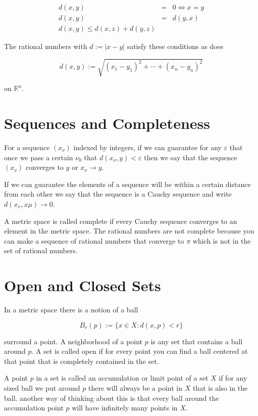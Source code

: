 \documentclass[oneside]{book}
\begin{document}
\begin{eqnarray}
d(x,y) &=& 0 \iff x =y\nonumber\\
d(x,y) &=& d(y,x) \\
d(x,y) \le d(x,z) + d(y,z)
\end{eqnarray}

The rational numbers with $d := | x-y |$ satisfy these conditions as does

\begin{equation}
d(x,y) := \sqrt{(x_1-y_1)^2 + \cdots + (x_n-y_n)^2}
\end{equation}

on $\mathbb{R}^n$.

\section{Sequences and Completeness}
For a sequence $(x_\nu)$ indexed by integers, if we can guarantee for any $\varepsilon$ that once we pass a certain $\nu_0$ that $d(x_\nu,y) < \varepsilon$ then we say that the sequence $(x_\nu)$ converges to $y$ or $x_\nu \to y$. 

If we can guarantee the elements of a sequence will be within a certain distance from each other we say that the sequence is a Cauchy sequence and write $d(x_\nu,x\mu) \to 0$.

A metric space is called complete if every Cauchy sequence converges to an element in the metric space. The rational numbers are not complete because you can make a sequence of rational numbers that converge to $\pi$ which is not in the set of rational numbers. 


\section{Open and Closed Sets}
In a metric space there is a notion of a ball

\begin{equation}
B_r(p) := \{x \in X: d(x,p) < r\}
\end{equation}

surround a point. A neighborhood of a point $p$ is any set that contains a ball around $p$. A set is called open if for every point you can find a ball centered at that point that is completely contained in the set. 

A point $p$ in a set is called an accumulation or limit point of a set $X$ if for any sized ball we put around $p$ there will always be a point in $X$ that is also in the ball. another way of thinking about this is that every ball around the accumulation point $p$ will have infinitely many points in $X$.
\end{document}
